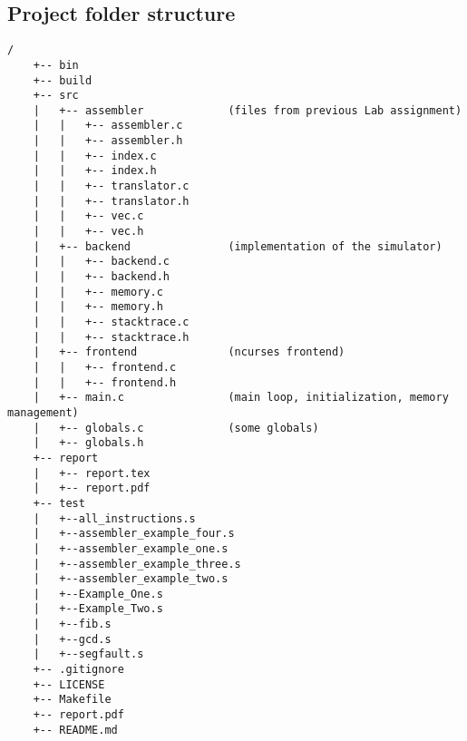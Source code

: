 \documentclass[12pt]{article}
\begin{document}
	\newpage
	\subsection{Project folder structure}
	
	\begin{verbatim}/
	+-- bin
	+-- build
	+-- src
	|   +-- assembler             (files from previous Lab assignment)
	|   |   +-- assembler.c
	|   |   +-- assembler.h
	|   |   +-- index.c
	|   |   +-- index.h
	|   |   +-- translator.c
	|   |   +-- translator.h
	|   |   +-- vec.c
	|   |   +-- vec.h
	|   +-- backend               (implementation of the simulator)
	|   |   +-- backend.c
	|   |   +-- backend.h
	|   |   +-- memory.c
	|   |   +-- memory.h
	|   |   +-- stacktrace.c
	|   |   +-- stacktrace.h
	|   +-- frontend              (ncurses frontend)
	|   |   +-- frontend.c
	|   |   +-- frontend.h
	|   +-- main.c                (main loop, initialization, memory management)
	|   +-- globals.c             (some globals)
	|   +-- globals.h
	+-- report
	|   +-- report.tex
	|   +-- report.pdf
	+-- test
	|   +--all_instructions.s  
	|   +--assembler_example_four.s  
	|   +--assembler_example_one.s  
	|   +--assembler_example_three.s  
	|   +--assembler_example_two.s  
	|   +--Example_One.s  
	|   +--Example_Two.s  
	|   +--fib.s  
	|   +--gcd.s  
	|   +--segfault.s
	+-- .gitignore
	+-- LICENSE
	+-- Makefile
	+-- report.pdf
	+-- README.md\end{verbatim}
\end{document}
